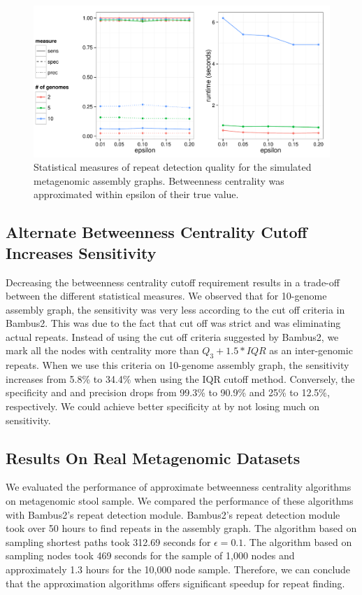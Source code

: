 \documentclass[runningheads,a4paper]{llncs}
\begin{document}
\begin{figure}[htbp]
\centering
\includegraphics[width = \textwidth]{sampled_paths}
\caption{Statistical measures of repeat detection quality for the simulated metagenomic assembly graphs. Betweenness centrality was approximated within epsilon of their true value.}
\label{fig:sampled_paths}
\end{figure}

\subsection*{Alternate Betweenness Centrality Cutoff Increases Sensitivity}

Decreasing the betweenness centrality cutoff requirement results in a trade-off between the different statistical measures.
We observed that for 10-genome assembly graph, the sensitivity was very less according to the cut off criteria in Bambus2. This was due to the fact that cut off was strict and was eliminating actual repeats.
Instead of using the cut off criteria suggested by Bambus2, we mark all the nodes with centrality more than $Q_{3} + 1.5*IQR$ as an inter-genomic repeats.
When we use this criteria on 10-genome assembly graph, the sensitivity increases from 5.8\% to 34.4\% when using the IQR cutoff method.
Conversely, the specificity and and precision drops from 99.3\% to 90.9\% and 25\% to 12.5\%, respectively.
We could achieve better specificity at by not losing much on sensitivity.

\subsection*{Results On Real Metagenomic Datasets}
We evaluated the performance of approximate betweenness centrality algorithms on metagenomic stool sample.
We compared the performance of these algorithms with Bambus2's repeat detection module.
Bambus2's repeat detection module took over 50 hours to find repeats in the assembly graph.
The algorithm based on sampling shortest paths took 312.69 seconds for $\epsilon = 0.1$.
The algorithm based on sampling nodes took 469 seconds for the sample of 1,000 nodes and approximately 1.3 hours for the 10,000 node sample. Therefore, we can conclude that the approximation algorithms offers significant speedup for repeat finding.  
\end{document}
